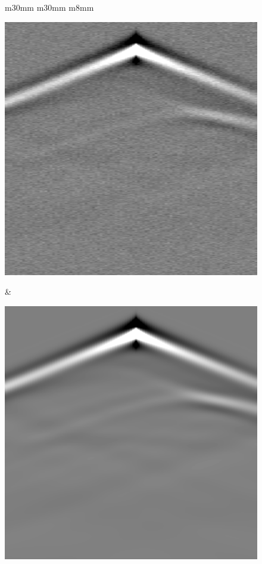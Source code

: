 \begin{figure}[t]
    \centering
    \begin{tabular}{m{30mm} m{30mm} m{8mm}}
        \begin{minipage}[b]{\linewidth}
            \centering
            \includegraphics[width=\linewidth]{public/seismic_data}
            \vspace{-9mm}
            \caption*{}
            \vspace{1mm}
        \end{minipage} &
        \begin{minipage}[b]{\linewidth}
            \centering
            \includegraphics[width=\linewidth]{public/seismic_data_noisy}

\end{minipage}
\end{tabular}
\end{figure}

